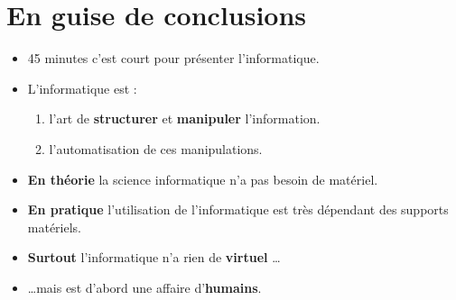 \section[Conclusion]{En guise de conclusions}
\begin{frame}
	\begin{itemize}
		\item 45 minutes c'est court pour présenter l'informatique.
		\item L'informatique est :
		\begin{enumerate}
			\item l'art de \textbf{structurer} et \textbf{manipuler} l'information.
			\item l'automatisation de ces manipulations.
		\end{enumerate}
		\item \textbf{En théorie} la science informatique n'a pas besoin de matériel.
		\item \textbf{En pratique} l'utilisation de l'informatique est très dépendant des supports matériels.
		\item \textbf{Surtout} l'informatique n'a rien de \textbf{virtuel} \ldots
		\item \ldots mais est d'abord une affaire d'\textbf{humains}.
	\end{itemize}
\end{frame}